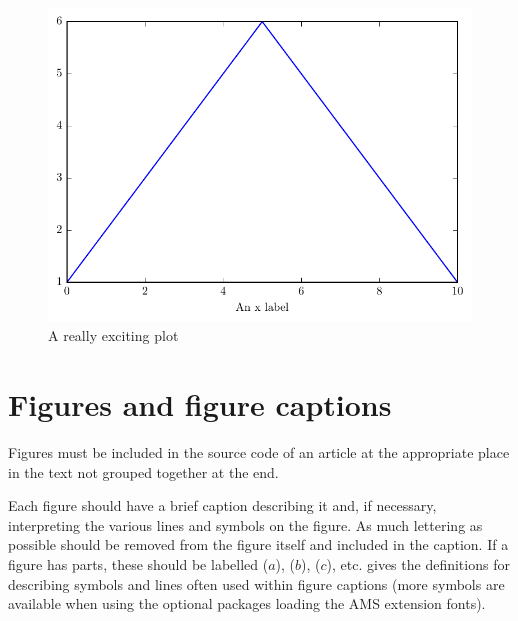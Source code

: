 \documentclass[a4paper]{jpconf}
\begin{document}
\begin{center}
    \begin{figure}
        \begin{minipage}{40pc}
            \includegraphics[width=40pc]{testMatplotlibPlot.pdf}
            \caption{A really exciting plot}
        \end{minipage}
    \end{figure}
\end{center}

\section{Figures and figure captions}
Figures must be included in the source code of an article at the appropriate place in the text not 
grouped together at the end. 

Each figure should have a brief caption describing it and, if 
necessary, interpreting the various lines and symbols on the figure. 
As much lettering as possible should be removed from the figure itself and 
included in the caption. If a figure has parts, these should be 
labelled ($a$), ($b$), ($c$), etc. 
 gives the definitions for describing symbols and lines often
used within figure captions (more symbols are available
when using the optional packages loading the AMS extension fonts).
\end{document}
